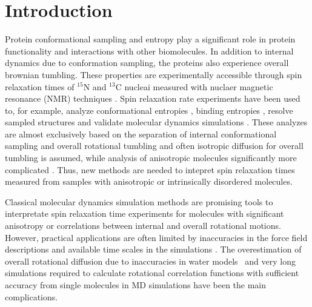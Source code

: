 \documentclass[pre,aps,floatfix,authordate1-4,twocolumn]{revtex4-1}
\begin{document}
\section{Introduction}
Protein conformational sampling and entropy
play a significant role in protein functionality
and interactions with other biomolecules.
In addition to internal dynamics due to conformation sampling, the
proteins also experience overall brownian tumbling.
These properties are experimentally accessible through 
spin relaxation times of $^{15}$N and $^{13}$C nucleai measured
with nuclaer magnetic resonance (NMR) 
techniques \cite{jarymowycz06,korzhnev01,bedem15,lewandowski15,lamley15}. 
Spin relaxation rate experiments have been used to, for example, analyze
conformational entropies \cite{kasinath13,allner15,jarymowycz06}, binding entropies \cite{akke93,jarymowycz06},
resolve sampled structures \cite{bedem15}
and validate molecular dynamics simulations \cite{best04,showalter07a,showalter07b,maragakis08,trbovic08}.
These analyzes are almost exclusively based on the
separation of internal conformational sampling 
and overall rotational tumbling \cite{wennerstrom79,Lipari82} and often
isotropic diffusion for overall tumbling is assumed, while
analysis of anisotropic molecules significantly more
complicated \cite{jarymowycz06,korzhnev01,luginbuhl97,hall04}.
Thus, new methods are needed to intepret spin relaxation times
measured from samples with anisotropic or intrinsically disordered molecules.


%

 
Classical molecular dynamics simulation methods are
promising tools to interpretate spin relaxation time experiments
for molecules with significant anisotropy or correlations between
internal and overall rotational motions. However, practical applications
are often limited by inaccuracies in the force field descriptions
and available time scales in the simulations \cite{prompers02,maragakis08,trbovic08,wong08,anderson12}.
The overestimation of overall rotational diffusion due to inaccuracies in 
water models~\cite{wong08} and very long simulations required to calculate rotational
correlation functions with sufficient accuracy from single molecules in MD
simulations \cite{lu06,anderson12} have been the main complications.
\end{document}
